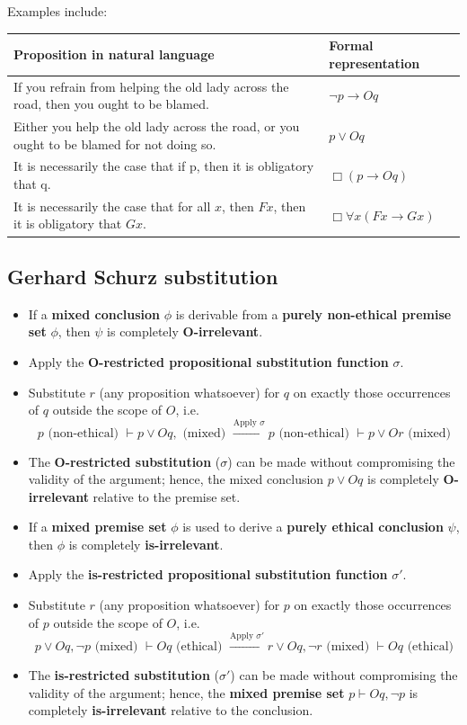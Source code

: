 \documentclass[11pt]{article}
\begin{document}
Examples include:
\begin{center}
\begin{tabular}{|m{25em}|m{5em}|}
\hline
Proposition in natural language & Formal representation\\
\hline
If you refrain from helping the old lady across the road, then you ought to be blamed. & \(\neg p \rightarrow Oq\)\\
\hline
Either you help the old lady across the road, or you ought to be blamed for not doing so. & \(p \vee Oq\)\\
\hline
It is necessarily the case that if p, then it is obligatory that q. & \(\Box (p \rightarrow Oq)\)\\
\hline
It is necessarily the case that for all \(x\), then \(Fx\), then it is obligatory that \(Gx\). & \(\Box \forall x (Fx \rightarrow Gx)\)\\
\hline
\end{tabular}
\end{center}
 \newpage
\subsection{Gerhard Schurz substitution}
\label{sec:orgcefd13a}
\begin{itemize}
\item If a \textbf{mixed conclusion} \(\phi\) is derivable from a \textbf{purely non-ethical premise set} \(\phi\), then \(\psi\) is completely \textbf{O-irrelevant}.
\item Apply the \textbf{O-restricted propositional substitution function} \(\sigma\).
\item Substitute \(r\) (any proposition whatsoever) for \(q\) on exactly those occurrences of \(q\) outside the scope of \(O\), i.e.
\[p \text{ (non-ethical) } \vdash p \vee Oq,  \text{ (mixed) } \xrightarrow{\text{Apply } \sigma} p \text{ (non-ethical) } \vdash p \vee Or \text{ (mixed)}\]
\item The \textbf{O-restricted substitution} (\(\sigma\)) can be made without compromising the validity of the argument; hence, the mixed conclusion \(p \vee Oq\) is completely \textbf{O-irrelevant} relative to the premise set.
\item If a \textbf{mixed premise set} \(\phi\) is used to derive a \textbf{purely ethical conclusion} \(\psi\), then \(\phi\) is completely \textbf{is-irrelevant}.
\item Apply the \textbf{is-restricted propositional substitution function} \(\sigma'\).
\item Substitute \(r\) (any proposition whatsoever) for \(p\) on exactly those occurrences of \(p\) outside the scope of \(O\), i.e.
\[p \vee Oq, \neg p \text{ (mixed) } \vdash Oq \text{ (ethical) } \xrightarrow{\text{Apply } \sigma'} r \vee Oq, \neg r \text{ (mixed) } \vdash Oq \text{ (ethical)}\]
\item The \textbf{is-restricted substitution} (\(\sigma'\)) can be made without compromising the validity of the argument; hence, the \textbf{mixed premise set} \(p \vdash Oq, \neg p\) is completely \textbf{is-irrelevant} relative to the conclusion.
\end{itemize}
\end{document}
